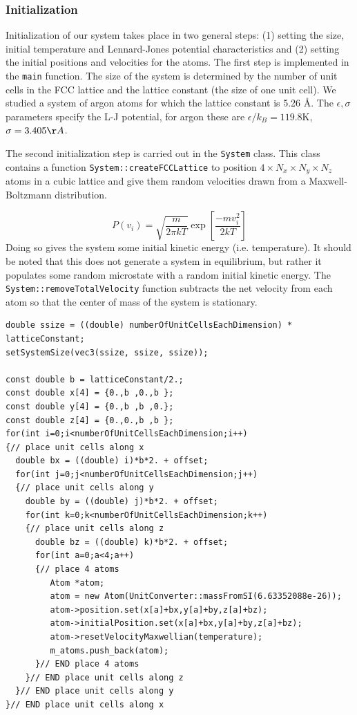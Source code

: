 \documentclass[10pt,showpacs,preprintnumbers,footinbib,amsmath,amssymb,aps,prl,twocolumn,groupedaddress,superscriptaddress,showkeys]{revtex4-1}
\begin{document}
\subsubsection*{Initialization}

Initialization of our system takes place in two general steps: (1)
setting the size, initial temperature and Lennard-Jones potential
characteristics and (2) setting the initial positions and velocities
for the atoms. The first step is implemented in the \texttt{main}
function. The size of the system is determined by the number of
unit cells in the FCC lattice and the lattice constant (the size of
one unit cell). We studied a system of argon atoms for which
the lattice constant is 5.26 {\AA}. The
$\epsilon,\sigma$ parameters specify the L-J potential, for argon
these are $\epsilon / k_B = 119.8\mathrm{K}$, $ \sigma=3.405
{\AA}$.

The second initialization step is carried out in the \texttt{System}
class. This class contains a function \texttt{System::createFCCLattice}
to position $4 \times N_x \times N_y \times N_z$ atoms in a cubic lattice
and give them random velocities drawn from a Maxwell-Boltzmann
distribution.

\begin{equation*}
	P(v_i) = \sqrt{\frac{m}{2 \pi k T}} \exp \left [ \frac{-m v_i ^2}{2kT} \right ]
\end{equation*}
Doing so gives the system some
initial kinetic energy (i.e. temperature). It should be noted that this
does not generate a system
in equilibrium, but rather it populates some random microstate with a
random initial kinetic energy. The \texttt{System::removeTotalVelocity}
function subtracts the net velocity from each atom so that the center of
mass of the system is stationary.


\begin{lstlisting}
double ssize = ((double) numberOfUnitCellsEachDimension) * latticeConstant;
setSystemSize(vec3(ssize, ssize, ssize));

const double b = latticeConstant/2.;
const double x[4] = {0.,b ,0.,b };
const double y[4] = {0.,b ,b ,0.};
const double z[4] = {0.,0.,b ,b };
for(int i=0;i<numberOfUnitCellsEachDimension;i++)
{// place unit cells along x
  double bx = ((double) i)*b*2. + offset;
  for(int j=0;j<numberOfUnitCellsEachDimension;j++)
  {// place unit cells along y
    double by = ((double) j)*b*2. + offset;
    for(int k=0;k<numberOfUnitCellsEachDimension;k++)
    {// place unit cells along z
      double bz = ((double) k)*b*2. + offset;
      for(int a=0;a<4;a++)
      {// place 4 atoms
         Atom *atom;
         atom = new Atom(UnitConverter::massFromSI(6.63352088e-26));
         atom->position.set(x[a]+bx,y[a]+by,z[a]+bz);
         atom->initialPosition.set(x[a]+bx,y[a]+by,z[a]+bz);
         atom->resetVelocityMaxwellian(temperature);
         m_atoms.push_back(atom);
      }// END place 4 atoms
    }// END place unit cells along z
  }// END place unit cells along y
}// END place unit cells along x
\end{lstlisting}
\end{document}
